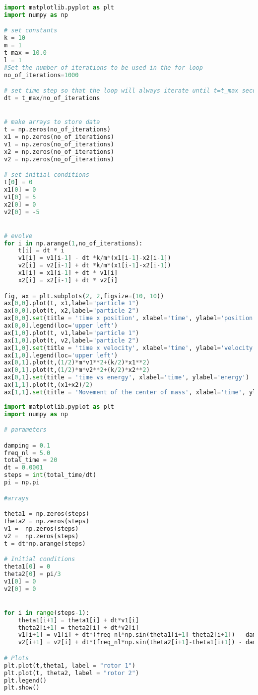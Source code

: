 \begin{lstlisting}[language=Python, frame=lines, basicstyle=\footnotesize, caption={Oscilador Harmônico Duplo}, label={lst:OHS2}]
import matplotlib.pyplot as plt
import numpy as np

# set constants
k = 10
m = 1
t_max = 10.0
l = 1
#Set the number of iterations to be used in the for loop
no_of_iterations=1000

# set time step so that the loop will always iterate until t=t_max seconds 
dt = t_max/no_of_iterations


# make arrays to store data
t = np.zeros(no_of_iterations)
x1 = np.zeros(no_of_iterations)
v1 = np.zeros(no_of_iterations)
x2 = np.zeros(no_of_iterations)
v2 = np.zeros(no_of_iterations)

# set initial conditions
t[0] = 0
x1[0] = 0
v1[0] = 5
x2[0] = 0
v2[0] = -5


# evolve
for i in np.arange(1,no_of_iterations):
    t[i] = dt * i
    v1[i] = v1[i-1] - dt *k/m*(x1[i-1]-x2[i-1])
    v2[i] = v2[i-1] + dt *k/m*(x1[i-1]-x2[i-1])
    x1[i] = x1[i-1] + dt * v1[i]
    x2[i] = x2[i-1] + dt * v2[i]

fig, ax = plt.subplots(2, 2,figsize=(10, 10))
ax[0,0].plot(t, x1,label="particle 1")
ax[0,0].plot(t, x2,label="particle 2")
ax[0,0].set(title = 'time x position', xlabel='time', ylabel='position')
ax[0,0].legend(loc='upper left')
ax[1,0].plot(t, v1,label="particle 1")
ax[1,0].plot(t, v2,label="particle 2")
ax[1,0].set(title = 'time x velocity', xlabel='time', ylabel='velocity')
ax[1,0].legend(loc='upper left')
ax[0,1].plot(t,(1/2)*m*v1**2+(k/2)*x1**2)
ax[0,1].plot(t,(1/2)*m*v2**2+(k/2)*x2**2)
ax[0,1].set(title = 'time vs energy', xlabel='time', ylabel='energy')
ax[1,1].plot(t,(x1+x2)/2)
ax[1,1].set(title = 'Movement of the center of mass', xlabel='time', ylabel='Center of Mass')
\end{lstlisting}

\begin{lstlisting}[language=Python, frame=lines, basicstyle=\footnotesize, caption={Rotores acoplados}, label={lst:OH-Rotores}]
import matplotlib.pyplot as plt
import numpy as np

# parameters

damping = 0.1
freq_nl = 5.0
total_time = 20
dt = 0.0001
steps = int(total_time/dt)
pi = np.pi

#arrays

theta1 = np.zeros(steps)
theta2 = np.zeros(steps)
v1 =  np.zeros(steps)
v2 =  np.zeros(steps)
t = dt*np.arange(steps)

# Initial conditions
theta1[0] = 0
theta2[0] = pi/3
v1[0] = 0
v2[0] = 0


for i in range(steps-1):
    theta1[i+1] = theta1[i] + dt*v1[i]
    theta2[i+1] = theta2[i] + dt*v2[i]
    v1[i+1] = v1[i] + dt*(freq_nl*np.sin(theta1[i+1]-theta2[i+1]) - damping*v1[i+1])
    v2[i+1] = v2[i] + dt*(freq_nl*np.sin(theta2[i+1]-theta1[i+1]) - damping*v2[i+1])

# Plots
plt.plot(t,theta1, label = "rotor 1")
plt.plot(t, theta2, label = "rotor 2")
plt.legend()
plt.show()
\end{lstlisting}

